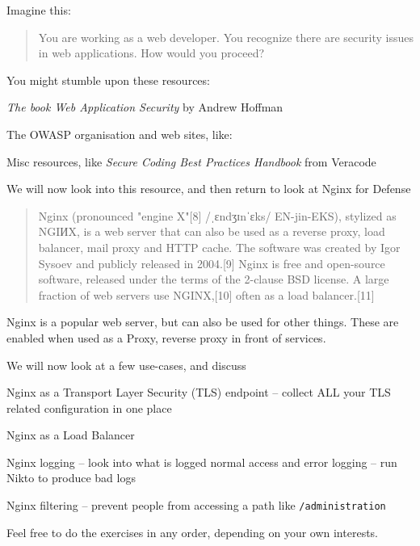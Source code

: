 \documentclass[Screen16to9,17pt]{foils}
\begin{document}







Imagine this:
\begin{quote}
You are working as a web developer. You recognize there are security issues in web applications. How would you proceed?
\end{quote}

You might stumble upon these resources:
\begin{list2}
\item \emph{The book Web Application Security} by Andrew Hoffman
\item The OWASP organisation and web sites, like:\\
\item Misc resources, like \emph{Secure Coding Best Practices Handbook} from Veracode
\end{list2}

We will now look into this resource, and then return to look at Nginx for Defense




\begin{quote}
Nginx (pronounced "engine X"[8] /ˌɛndʒɪnˈɛks/ EN-jin-EKS), stylized as NGIИX, is a web server that can also be used as a reverse proxy, load balancer, mail proxy and HTTP cache. The software was created by Igor Sysoev and publicly released in 2004.[9] Nginx is free and open-source software, released under the terms of the 2-clause BSD license. A large fraction of web servers use NGINX,[10] often as a load balancer.[11]
\end{quote}

Nginx is a popular web server, but can also be used for other things. These are enabled when used as a Proxy, reverse proxy in front of services.


We will now look at a few use-cases, and discuss
\begin{list2}
\item Nginx as a Transport Layer Security (TLS) endpoint -- collect ALL your TLS related configuration in one place
\item Nginx as a Load Balancer
\item Nginx logging -- look into what is logged normal access and error logging -- run Nikto to produce bad logs
\item Nginx filtering -- prevent people from accessing a path like \verb+/administration+
\end{list2}

Feel free to do the exercises in any order, depending on your own interests.





\slidenext{}
\end{document}
